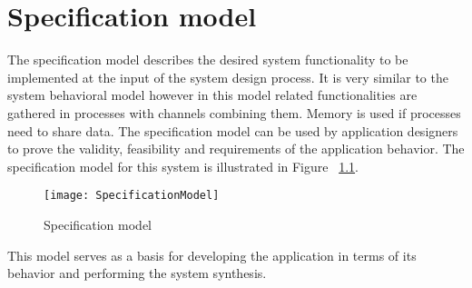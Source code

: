 \chapter{Specification model}

The specification model describes the desired system functionality to be implemented at the input of the system design process. It is very similar to the system behavioral model however in this model related functionalities are gathered in processes with channels combining them. Memory is used if processes need to share data. The specification model can be used by application designers to prove the validity, feasibility and requirements of the application behavior.
The specification model for this system is illustrated in Figure ~\ref{fig:SpecificationModel}.

\begin{figure}[H]
\centering
\texttt{[image: SpecificationModel]}
\caption{Specification model}
\label{fig:SpecificationModel}
\end{figure}

This model serves as a basis for developing the application in terms of its behavior and performing the system synthesis.
